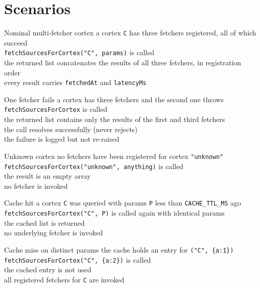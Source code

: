 \section{Scenarios}

\begin{scenario}{Nominal multi-fetcher cortex}
\Given a cortex \texttt{C} has three fetchers registered, all of which succeed \\
\When \texttt{fetchSourcesForCortex("C", params)} is called \\
\Then the returned list concatenates the results of all three fetchers, in registration order \\
\And every result carries \texttt{fetchedAt} and \texttt{latencyMs}
\end{scenario}

\begin{scenario}{One fetcher fails}
\Given a cortex has three fetchers and the second one throws \\
\When \texttt{fetchSourcesForCortex} is called \\
\Then the returned list contains only the results of the first and third fetchers \\
\And the call resolves successfully (never rejects) \\
\And the failure is logged but not re-raised
\end{scenario}

\begin{scenario}{Unknown cortex}
\Given no fetchers have been registered for cortex \texttt{"unknown"} \\
\When \texttt{fetchSourcesForCortex("unknown", anything)} is called \\
\Then the result is an empty array \\
\And no fetcher is invoked
\end{scenario}

\begin{scenario}{Cache hit}
\Given a cortex \texttt{C} was queried with params \texttt{P} less than \texttt{CACHE\_TTL\_MS} ago \\
\When \texttt{fetchSourcesForCortex("C", P)} is called again with identical params \\
\Then the cached list is returned \\
\And no underlying fetcher is invoked
\end{scenario}

\begin{scenario}{Cache miss on distinct params}
\Given the cache holds an entry for \texttt{("C", \{a:1\})} \\
\When \texttt{fetchSourcesForCortex("C", \{a:2\})} is called \\
\Then the cached entry is not used \\
\And all registered fetchers for \texttt{C} are invoked
\end{scenario}

